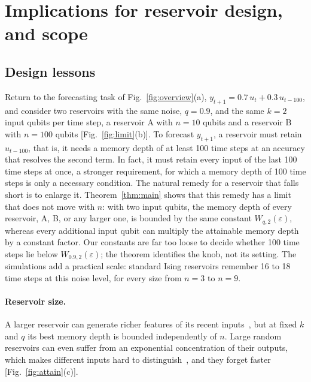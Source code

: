 \documentclass[aps,prl,twocolumn,superscriptaddress,floatfix]{revtex4-2}
\theoremstyle{plain}
\begin{document}
\section{Implications for reservoir design, and scope}
\label{sm:scope}

\subsection{Design lessons}

Return to the forecasting task of Fig.~\ref{fig:overview}(a), $y_{t+1}=0.7\,u_t+0.3\,u_{t-100}$, and consider two reservoirs with the same noise, $q=0.9$, and the same $k=2$ input qubits per time step, a reservoir A with $n=10$ qubits and a reservoir B with $n=100$ qubits [Fig.~\ref{fig:limit}(b)]. To forecast $y_{t+1}$, a reservoir must retain $u_{t-100}$, that is, it needs a memory depth of at least 100 time steps at an accuracy that resolves the second term. In fact, it must retain every input of the last 100 time steps at once, a stronger requirement, for which a memory depth of 100 time steps is only a necessary condition. The natural remedy for a reservoir that falls short is to enlarge it. Theorem~\ref{thm:main} shows that this remedy has a limit that does not move with $n$: with two input qubits, the memory depth of every reservoir, A, B, or any larger one, is bounded by the same constant $W_{q,2}(\varepsilon)$, whereas every additional input qubit can multiply the attainable memory depth by a constant factor. Our constants are far too loose to decide whether 100 time steps lie below $W_{0.9,2}(\varepsilon)$; the theorem identifies the knob, not its setting. The simulations add a practical scale: standard Ising reservoirs remember 16 to 18 time steps at this noise level, for every size from $n=3$ to $n=9$.

\paragraph*{Reservoir size.} A larger reservoir can generate richer features of its recent inputs~\cite{Nakajima2019}, but at fixed $k$ and $q$ its best memory depth is bounded independently of $n$. Large random reservoirs can even suffer from an exponential concentration of their outputs, which makes different inputs hard to distinguish~\cite{Xiong2025,Dao2026}, and they forget faster [Fig.~\ref{fig:attain}(c)].
\end{document}
